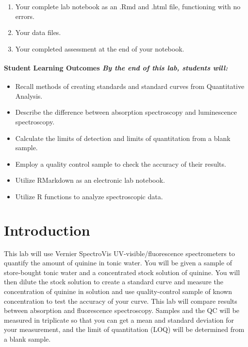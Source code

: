 \documentclass[]{tufte-book}
\providecommand{\tightlist}{%
  \setlength{\itemsep}{0pt}\setlength{\parskip}{0pt}}
\begin{document}
\begin{enumerate}
\def\labelenumi{\arabic{enumi}.}
\tightlist
\item
  Your complete lab notebook as an .Rmd and .html file, functioning with no errors.\\
\item
  Your data files.\\
\item
  Your completed assessment at the end of your notebook.
\end{enumerate}

\hypertarget{student-learning-outcomes-by-the-end-of-this-lab-students-will-2}{%
\paragraph{\texorpdfstring{\textbf{Student Learning Outcomes} \textbar{} \emph{By the end of this lab, students will:}}{Student Learning Outcomes \textbar{} By the end of this lab, students will:}}\label{student-learning-outcomes-by-the-end-of-this-lab-students-will-2}}

\begin{itemize}
\tightlist
\item
  Recall methods of creating standards and standard curves from Quantitative Analysis.\\
\item
  Describe the difference between absorption spectroscopy and luminescence spectroscopy.
\item
  Calculate the limits of detection and limits of quantitation from a blank sample.
\item
  Employ a quality control sample to check the accuracy of their results.
\item
  Utilize RMarkdown as an electronic lab notebook.
\item
  Utilize R functions to analyze spectroscopic data.
\end{itemize}

\hypertarget{uv-vis-intro}{%
\section*{Introduction}\label{uv-vis-intro}}

This lab will use Vernier SpectroVis UV-visible/fluorescence spectrometers to quantify the amount of quinine in tonic water. You will be given a sample of store-bought tonic water and a concentrated stock solution of quinine. You will then dilute the stock solution to create a standard curve and measure the concentration of quinine in solution and use quality-control sample of known concentration to test the accuracy of your curve. This lab will compare results between absorption and fluorescence spectroscopy. Samples and the QC will be measured in triplicate so that you can get a mean and standard deviation for your measurement, and the limit of quantitation (LOQ) will be determined from a blank sample.
\end{document}
